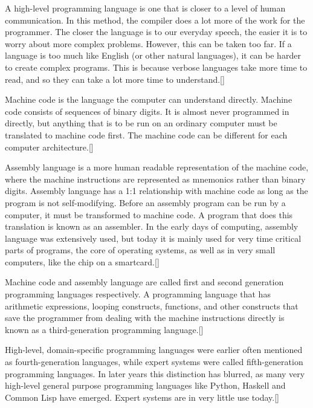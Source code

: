 A high-level programming language is one that is closer to a level of human communication. In this method, the compiler does a lot more of the work for the programmer. The closer the language is to our everyday speech, the easier it is to worry about more complex problems. However, this can be taken too far. If a language is too much like English (or other natural languages), it can be harder to create complex programs. This is because verbose languages take more time to read, and so they can take a lot more time to understand.[\cite{6}]
\newline

Machine code is the language the computer can understand directly. Machine code consists of sequences of binary digits. It is almost never programmed in directly, but anything that is to be run on an ordinary computer must be translated to machine code first. The machine code can be different for each computer architecture.[\cite{6}]
\newline

Assembly language is a more human readable representation of the machine code, where the machine instructions are represented as mnemonics rather than binary digits. Assembly language has a 1:1 relationship with machine code as long as the program is not self-modifying. Before an assembly program can be run by a computer, it must be transformed to machine code. A program that does this translation is known as an assembler. In the early days of computing, assembly language was extensively used, but today it is mainly used for very time critical parts of programs, the core of operating systems, as well as in very small computers, like the chip on a smartcard.[\cite{6}]
\newline

Machine code and assembly language are called first and second generation programming languages respectively. A programming language that has arithmetic expressions, looping constructs, functions, and other constructs that save the programmer from dealing with the machine instructions directly is known as a third-generation programming language.[\cite{6}]
\newline

High-level, domain-specific programming languages were earlier often mentioned as fourth-generation languages, while expert systems were called fifth-generation programming languages. In later years this distinction has blurred, as many very high-level general purpose programming languages like Python, Haskell and Common Lisp have emerged. Expert systems are in very little use today.[\cite{6}]

